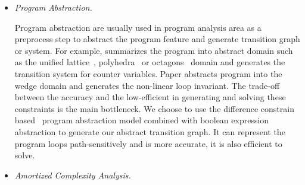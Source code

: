 \begin{itemize}
\item \emph{Program Abstraction.}

Program abstraction are usually used in program analysis area as a preprocess step to abstract the program feature and generate transition graph or system. For example, \cite{GulwaniZ10} summarizes the program into abstract domain such as the unified lattice~\cite{CousotH78}, polyhedra~\cite{CousotC77} or octagons~\cite{Mine06} domain and generates the transition system for counter variables.
Paper \cite{KincaidCBR18} abstracts program into the wedge domain and generates the non-linear loop invariant.
The trade-off between the accuracy and the low-efficient in generating and solving these constraints is the main bottleneck.
We choose to use the difference constrain based~\cite{SinnZV17,SinnZV14} program abstraction model combined with boolean expression abstraction to generate our abstract transition graph. It can represent the program loops path-sensitively and is more accurate, it is also efficient to solve. 

\item \emph{Amortized Complexity Analysis.}


\end{itemize}
